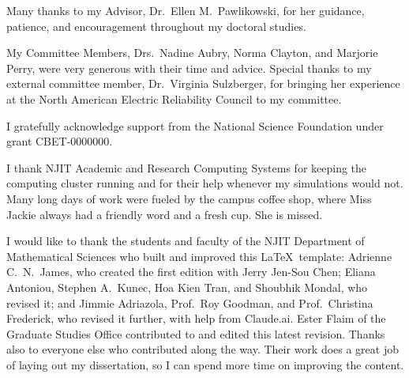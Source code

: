 
%
%

Many thanks to my Advisor, Dr.\ Ellen M.\ Pawlikowski, for her guidance, patience, and encouragement throughout my doctoral studies.

My Committee Members, Drs.\ Nadine Aubry, Norma Clayton, and Marjorie Perry, were very generous with their time and advice. Special thanks to my external committee member, Dr.\ Virginia Sulzberger, for bringing her experience at the North American Electric Reliability Council to my committee.

I gratefully acknowledge support from the National Science Foundation under grant CBET-0000000.

I thank NJIT Academic and Research Computing Systems for keeping the computing cluster running and for their help whenever my simulations would not. Many long days of work were fueled by the campus coffee shop, where Miss Jackie always had a friendly word and a fresh cup. She is missed.

I would like to thank the students and faculty of the NJIT Department of Mathematical Sciences who built and improved this \LaTeX\ template: Adrienne C.\ N.\ James, who created the first edition with Jerry Jen-Sou Chen; Eliana Antoniou, Stephen A.\ Kunec, Hoa Kien Tran, and Shoubhik Mondal, who revised it; and Jimmie Adriazola, Prof.\ Roy Goodman, and Prof.\ Christina Frederick, who revised it further, with help from Claude.ai. Ester Flaim of the Graduate Studies Office contributed to and edited this latest revision. Thanks also to everyone else who contributed along the way. Their work does a great job of laying out my dissertation, so I can spend more time on improving the content.
